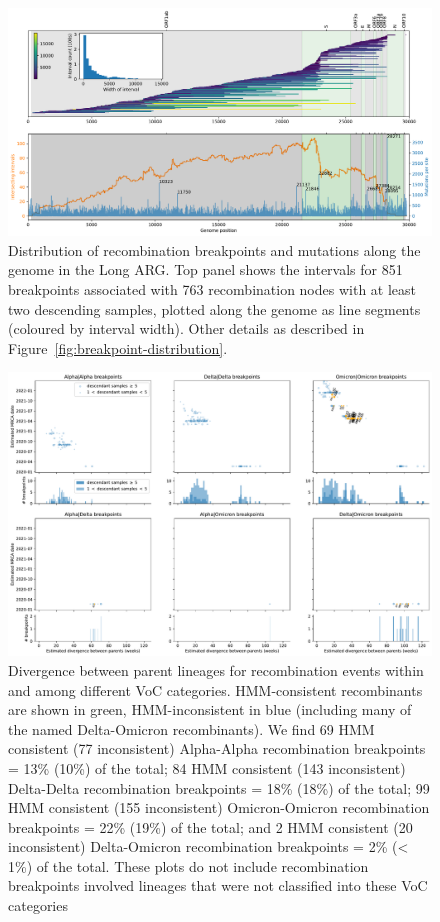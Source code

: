 \documentclass{article}
\begin{document}
\begin{figure}
\centering
\includegraphics[width=\textwidth]{figures/long_arg_recombination_intervals.pdf}
\caption{\label{fig:long_arg_breakpoint_distribution}
Distribution of recombination breakpoints and mutations along the genome in
the Long ARG.
Top panel shows the intervals for 851 breakpoints associated
with 763 recombination nodes with at least two descending samples, plotted along the genome
as line segments (coloured by interval width).
Other details as described in Figure~\ref{fig:breakpoint-distribution}.}
\end{figure}


\begin{figure} \centering
\includegraphics[width=\textwidth]{figures/supp_recombination_node_mrcas.pdf}
\caption{\label{fig:recomb_mrcas_voc_breakdown}  Divergence between parent
lineages for recombination events within and among different VoC categories.
HMM-consistent recombinants are shown in green, HMM-inconsistent in blue
(including many of the named Delta-Omicron recombinants). We find 69 HMM
consistent (77 inconsistent) Alpha-Alpha recombination breakpoints = 13\%
(10\%) of the total; 84 HMM consistent (143 inconsistent) Delta-Delta
recombination breakpoints = 18\% (18\%) of the total; 99 HMM consistent (155
inconsistent) Omicron-Omicron recombination breakpoints = 22\% (19\%) of the
total; and 2 HMM consistent (20 inconsistent) Delta-Omicron recombination
breakpoints = 2\% (< 1\%) of the total. These plots do not include
recombination breakpoints involved lineages that were not classified into these
VoC categories}
\end{figure}
\end{document}
